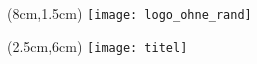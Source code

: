 \begin{titlepage}~


\begin{textblock*}{5cm}(8cm,1.5cm)
\texttt{[image: logo\_ohne\_rand]}
\end{textblock*}


\begin{textblock*}{12cm}(2.5cm,6cm)
\texttt{[image: titel]}
\end{textblock*}






\end{titlepage}
\newpage